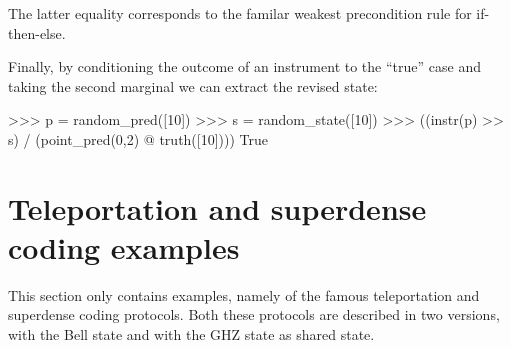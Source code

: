 \documentclass[leqno]{tufte-book} %
\begin{document}
\noindent The latter equality corresponds to the familar weakest
precondition rule for if-then-else.

Finally, by conditioning the outcome of an instrument to the ``true''
case and taking the second marginal we can extract the revised state:
\begin{python}
>>> p = random_pred([10])
>>> s = random_state([10])
>>> ((instr(p) >> s) / (point_pred(0,2) @ truth([10]))) %
True
\end{python}


\section{Teleportation and superdense coding examples}\label{sec:teleportation}

This section only contains examples, namely of the famous
teleportation and superdense coding protocols. Both these protocols
are described in two versions, with the Bell state and with the GHZ
state as shared state.
\end{document}
